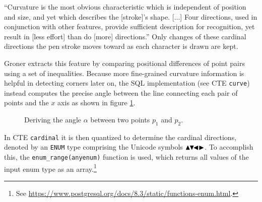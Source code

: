 \documentclass[sigconf]{acmart}
\begin{document}
\enquote{Curvature is the most obvious characteristic which is independent of position and size, and yet which describes the [stroke]'s shape. [...] Four directions, used in conjunction with other features, provide sufficient description for recognition, yet result in [less effort] than do [more] directions.} \cite{groner} Only changes of these cardinal directions the pen stroke moves toward as each character is drawn are kept.

Groner extracts this feature by comparing positional differences of point pairs using a set of inequalities. Because more fine-grained curvature information is helpful in detecting corners later on, the SQL implementation (see CTE \texttt{curve}) instead computes the precise angle between the line connecting each pair of points and the $x$ axis as shown in figure \ref{tan}.

\begin{figure}[htpb]
  \centering
  \caption{Deriving the angle $\alpha$ between two points $p_1$ and $p_2$.}
  \label{tan}
\end{figure}

In CTE \texttt{cardinal} it is then quantized to determine the cardinal directions, denoted by an \texttt{ENUM} type comprising the Unicode symbols $\blacktriangle\hspace{-0.15em}\blacktriangledown\hspace{-0.45em}\blacktriangleleft\blacktriangleright$. To accomplish this, the \texttt{enum\_range(anyenum)} function is used, which returns all values of the input enum type as an array.\footnote{See \url{https://www.postgresql.org/docs/8.3/static/functions-enum.html}.}
\end{document}
